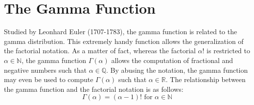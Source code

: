 \documentclass[12pt]{article}
\begin{document}

\pagebreak
\section{The Gamma Function}
\vspace*{-6pt}
Studied by Leonhard Euler (1707-1783), the gamma function is related to the gamma distribution. This extremely handy
function allows the generalization of the factorial notation. As a matter of fact, whereas the factorial $\alpha!$ is
restricted to $\alpha\in\mathbb{N}$, the gamma function $\Gamma(\alpha)$ allows the computation of fractional and
negative numbers such that $\alpha\in\mathbb{Q}$. By abusing the notation, the gamma function may even be used to
compute $\Gamma(\alpha)$ such that $\alpha\in\mathbb{R}$. The relationship between the gamma function and the factorial
notation is as follows:
\vspace*{-18pt}
\begin{equation}\label{eq:gammafunction:factorial}
	\Gamma(\alpha)=(\alpha-1)!\text{ for }\alpha\in\mathbb{N}
\end{equation}
\vspace*{-60pt}
\end{document}
